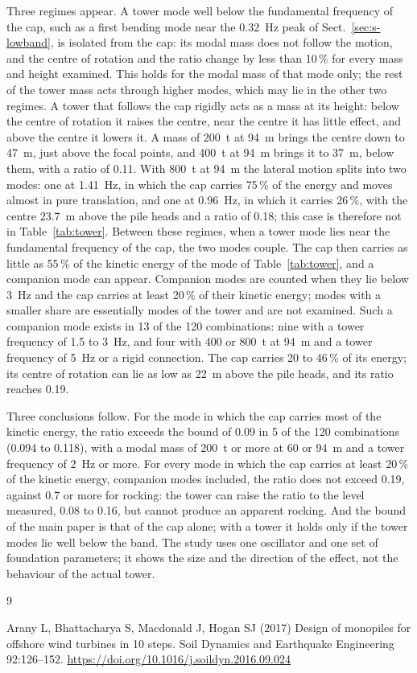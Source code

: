 \documentclass[11pt]{article}
\begin{document}
Three regimes appear. A tower mode well below the fundamental frequency of the
cap, such as a first bending mode near the 0.32~Hz peak of
Sect.~\ref{sec:s-lowband}, is isolated from the cap: its modal mass does not
follow the motion, and the centre of rotation and the ratio change by less
than 10\,\% for every mass and height examined. This holds for the modal mass
of that mode only; the rest of the tower mass acts through higher modes, which
may lie in the other two regimes. A tower that follows the cap rigidly acts as
a mass at its height: below the centre of rotation it raises the centre, near
the centre it has little effect, and above the centre it lowers it. A mass of
200~t at 94~m brings the centre down to 47~m, just above the focal points, and
400~t at 94~m brings it to 37~m, below them, with a ratio of 0.11. With 800~t
at 94~m the lateral motion splits into two modes: one at 1.41~Hz, in which the
cap carries 75\,\% of the energy and moves almost in pure translation, and one
at 0.96~Hz, in which it carries 26\,\%, with the centre 23.7~m above the pile
heads and a ratio of 0.18; this case is therefore not in
Table~\ref{tab:tower}. Between
these regimes, when a tower mode lies near the fundamental frequency of the
cap, the two modes couple. The cap then carries as little as 55\,\% of the
kinetic energy of the mode of Table~\ref{tab:tower}, and a companion mode can
appear. Companion modes are counted when they lie below 3~Hz and the cap
carries at least 20\,\% of their kinetic energy; modes with a smaller share are
essentially modes of the tower and are not examined. Such a companion mode
exists in 13 of the 120 combinations: nine with a tower frequency of 1.5 to
3~Hz, and four with 400 or 800~t at 94~m and a tower frequency of 5~Hz or a
rigid connection. The cap carries 20 to 46\,\% of its energy; its centre of
rotation can lie as low as 22~m above the pile heads, and its ratio reaches
0.19.

Three conclusions follow. For the mode in which the cap carries most of the
kinetic energy, the ratio exceeds the bound of 0.09 in 5 of the 120
combinations (0.094 to 0.118), with a modal mass of 200~t or more at 60 or
94~m and a tower frequency of 2~Hz or more. For every mode in which the cap carries at
least 20\,\% of the kinetic energy, companion modes included, the ratio does
not exceed 0.19, against 0.7 or more for rocking: the tower can raise the ratio to the level measured, 0.08 to 0.16,
but cannot produce an apparent rocking. And the bound of the main paper is
that of the cap alone; with a tower it holds only if the tower modes lie well
below the band. The study uses one oscillator and one set of foundation
parameters; it shows the size and the direction of the effect, not the
behaviour of the actual tower.

\begin{thebibliography}{9}

Arany L, Bhattacharya S, Macdonald J, Hogan SJ (2017) Design of monopiles for offshore wind turbines in 10 steps. Soil Dynamics and Earthquake Engineering 92:126--152. \url{https://doi.org/10.1016/j.soildyn.2016.09.024}

\end{thebibliography}
\end{document}
